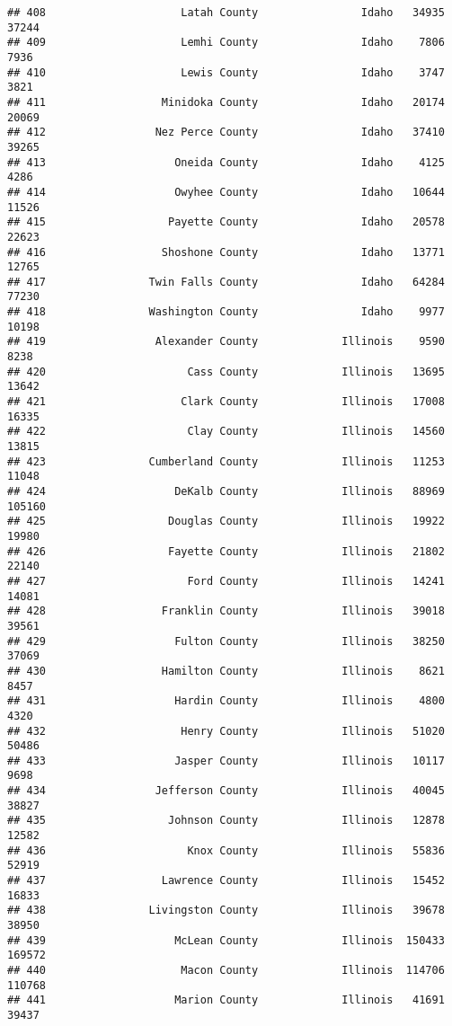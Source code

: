 \documentclass[
]{article}
\begin{document}
\begin{verbatim}
## 408                     Latah County                Idaho   34935   37244
## 409                     Lemhi County                Idaho    7806    7936
## 410                     Lewis County                Idaho    3747    3821
## 411                  Minidoka County                Idaho   20174   20069
## 412                 Nez Perce County                Idaho   37410   39265
## 413                    Oneida County                Idaho    4125    4286
## 414                    Owyhee County                Idaho   10644   11526
## 415                   Payette County                Idaho   20578   22623
## 416                  Shoshone County                Idaho   13771   12765
## 417                Twin Falls County                Idaho   64284   77230
## 418                Washington County                Idaho    9977   10198
## 419                 Alexander County             Illinois    9590    8238
## 420                      Cass County             Illinois   13695   13642
## 421                     Clark County             Illinois   17008   16335
## 422                      Clay County             Illinois   14560   13815
## 423                Cumberland County             Illinois   11253   11048
## 424                    DeKalb County             Illinois   88969  105160
## 425                   Douglas County             Illinois   19922   19980
## 426                   Fayette County             Illinois   21802   22140
## 427                      Ford County             Illinois   14241   14081
## 428                  Franklin County             Illinois   39018   39561
## 429                    Fulton County             Illinois   38250   37069
## 430                  Hamilton County             Illinois    8621    8457
## 431                    Hardin County             Illinois    4800    4320
## 432                     Henry County             Illinois   51020   50486
## 433                    Jasper County             Illinois   10117    9698
## 434                 Jefferson County             Illinois   40045   38827
## 435                   Johnson County             Illinois   12878   12582
## 436                      Knox County             Illinois   55836   52919
## 437                  Lawrence County             Illinois   15452   16833
## 438                Livingston County             Illinois   39678   38950
## 439                    McLean County             Illinois  150433  169572
## 440                     Macon County             Illinois  114706  110768
## 441                    Marion County             Illinois   41691   39437

\end{verbatim}
\end{document}
